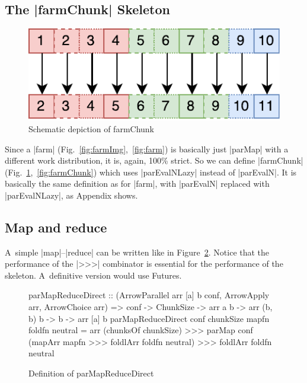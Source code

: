 \subsection{The |farmChunk| Skeleton}
\begin{figure}[h]
	\includegraphics[scale=0.7]{images/farmChunk}
\caption{Schematic depiction of farmChunk}
\label{fig:farmChunkImg}
\end{figure}
Since a |farm| (Fig.~\ref{fig:farmImg},~\ref{fig:farm}) is basically just |parMap| with a different work distribution, it is, again, 100\% strict. So we can define |farmChunk| (Fig.~\ref{fig:farmChunkImg},~\ref{fig:farmChunk}) which uses |parEvalNLazy| instead of |parEvalN|. It is basically the same definition as for |farm|, with |parEvalN| replaced with |parEvalNLazy|, as Appendix shows.

\subsection{Map and reduce}

A~simple |map|--|reduce| can be written like in Figure~\ref{fig:parMapReduceDirect}. Notice that the performance of the |>>>| combinator is essential for the performance of the skeleton. A~definitive version would use Futures.





\begin{figure}[h]
\begin{code}
parMapReduceDirect :: (ArrowParallel arr [a] b conf, ArrowApply arr, ArrowChoice arr) =>
	conf -> ChunkSize -> arr a b -> arr (b, b) b -> b -> arr [a] b
parMapReduceDirect conf chunkSize mapfn foldfn neutral =
	arr (chunksOf chunkSize) >>>
	parMap conf (mapArr mapfn >>> foldlArr foldfn neutral) >>>
	foldlArr foldfn neutral
\end{code}
\caption{Definition of parMapReduceDirect}
\label{fig:parMapReduceDirect}
\end{figure}


